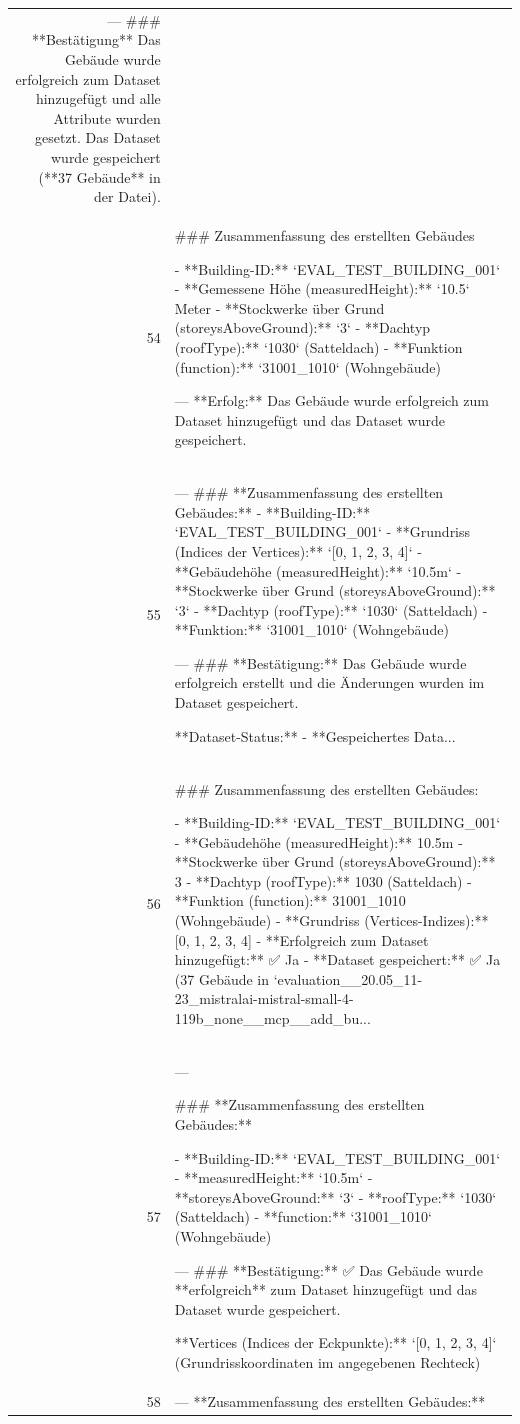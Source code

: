 \documentclass[a4paper,11pt]{article}
\begin{document}
\begin{table}[ht]
\begin{tabular}{r p{12cm}}
---
\#\#\# **Bestätigung**
Das Gebäude wurde erfolgreich zum Dataset hinzugefügt und alle Attribute wurden gesetzt. Das Dataset wurde gespeichert (**37 Gebäude** in der Datei). \\
54 & \#\#\# Zusammenfassung des erstellten Gebäudes

- **Building-ID:** `EVAL\_TEST\_BUILDING\_001`
- **Gemessene Höhe (measuredHeight):** `10.5` Meter
- **Stockwerke über Grund (storeysAboveGround):** `3`
- **Dachtyp (roofType):** `1030` (Satteldach)
- **Funktion (function):** `31001\_1010` (Wohngebäude)

---
**Erfolg:** Das Gebäude wurde erfolgreich zum Dataset hinzugefügt und das Dataset wurde gespeichert. \\
55 & ---
\#\#\# **Zusammenfassung des erstellten Gebäudes:**
- **Building-ID:** `EVAL\_TEST\_BUILDING\_001`
- **Grundriss (Indices der Vertices):** `[0, 1, 2, 3, 4]`
- **Gebäudehöhe (measuredHeight):** `10.5m`
- **Stockwerke über Grund (storeysAboveGround):** `3`
- **Dachtyp (roofType):** `1030` (Satteldach)
- **Funktion:** `31001\_1010` (Wohngebäude)

---
\#\#\# **Bestätigung:**
Das Gebäude wurde erfolgreich erstellt und die Änderungen wurden im Dataset gespeichert.

**Dataset-Status:**
- **Gespeichertes Data... \\
56 & \#\#\# Zusammenfassung des erstellten Gebäudes:

- **Building-ID:** `EVAL\_TEST\_BUILDING\_001`
- **Gebäudehöhe (measuredHeight):** 10.5m
- **Stockwerke über Grund (storeysAboveGround):** 3
- **Dachtyp (roofType):** 1030 (Satteldach)
- **Funktion (function):** 31001\_1010 (Wohngebäude)
- **Grundriss (Vertices-Indizes):** [0, 1, 2, 3, 4]
- **Erfolgreich zum Dataset hinzugefügt:** ✅ Ja
- **Dataset gespeichert:** ✅ Ja (37 Gebäude in `evaluation\_\_20.05\_11-23\_mistralai-mistral-small-4-119b\_none\_\_mcp\_\_add\_bu... \\
57 & ---

\#\#\# **Zusammenfassung des erstellten Gebäudes:**

- **Building-ID:** `EVAL\_TEST\_BUILDING\_001`
- **measuredHeight:** `10.5m`
- **storeysAboveGround:** `3`
- **roofType:** `1030` (Satteldach)
- **function:** `31001\_1010` (Wohngebäude)

---
\#\#\# **Bestätigung:**
✅ Das Gebäude wurde **erfolgreich** zum Dataset hinzugefügt und das Dataset wurde gespeichert.

**Vertices (Indices der Eckpunkte):**
`[0, 1, 2, 3, 4]` (Grundrisskoordinaten im angegebenen Rechteck) \\
58 & ---
**Zusammenfassung des erstellten Gebäudes:**


\end{tabular}
\end{table}
\end{document}
